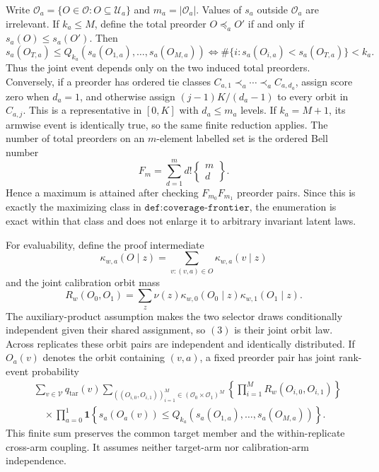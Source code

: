 Write \(\mathcal O_a=\{O\in\mathcal O:O\subseteq\mathcal U_a\}\) and \(m_a=|\mathcal O_a|\). Values of \(s_a\) outside \(\mathcal O_a\) are irrelevant. If \(k_a\le M\), define the total preorder \(O\preceq_a O'\) if and only if \(s_a(O)\le s_a(O')\). Then
\[
s_a(O_{T,a})\le Q_{k_a}(s_a(O_{1,a}),\ldots,s_a(O_{M,a}))
\iff
\#\{i:s_a(O_{i,a})<s_a(O_{T,a})\}<k_a.
\tag{1}
\]
Thus the joint event depends only on the two induced total preorders. Conversely, if a preorder has ordered tie classes \(C_{a,1}\prec_a\cdots\prec_a C_{a,d_a}\), assign score zero when \(d_a=1\), and otherwise assign \((j-1)K/(d_a-1)\) to every orbit in \(C_{a,j}\). This is a representative in \([0,K]\) with \(d_a\le m_a\) levels. If \(k_a=M+1\), its armwise event is identically true, so the same finite reduction applies. The number of total preorders on an \(m\)-element labelled set is the ordered Bell number
\[
F_m=\sum_{d=1}^m d!\left\{\begin{matrix}m\\d\end{matrix}\right\}.
\tag{2}
\]
Hence a maximum is attained after checking \(F_{m_0}F_{m_1}\) preorder pairs. Since this is exactly the maximizing class in \(\texttt{def:coverage-frontier}\), the enumeration is exact within that class and does not enlarge it to arbitrary invariant latent laws.

For evaluability, define the proof intermediate
\[
\kappa_{w,a}(O\mid z)=\sum_{v:(v,a)\in O}\kappa_{w,a}(v\mid z)
\]
and the joint calibration orbit mass
\[
R_w(O_0,O_1)=\sum_z\nu(z)\kappa_{w,0}(O_0\mid z)\kappa_{w,1}(O_1\mid z).
\tag{3}
\]
The auxiliary-product assumption makes the two selector draws conditionally independent given their shared assignment, so \((3)\) is their joint orbit law. Across replicates these orbit pairs are independent and identically distributed. If \(O_a(v)\) denotes the orbit containing \((v,a)\), a fixed preorder pair has joint rank-event probability
\[
\begin{aligned}
&\sum_{v\in\mathcal V}q_{\mathrm{tar}}(v)
\sum_{((O_{i,0},O_{i,1}))_{i=1}^M\in(\mathcal O_0\times\mathcal O_1)^M}
\left\{\prod_{i=1}^M R_w(O_{i,0},O_{i,1})\right\}\\
&\quad\times\prod_{a=0}^1
\mathbf 1\!\left\{s_a(O_a(v))\le Q_{k_a}(s_a(O_{1,a}),\ldots,s_a(O_{M,a}))\right\}.
\end{aligned}
\tag{4}
\]
This finite sum preserves the common target member and the within-replicate cross-arm coupling. It assumes neither target-arm nor calibration-arm independence.

